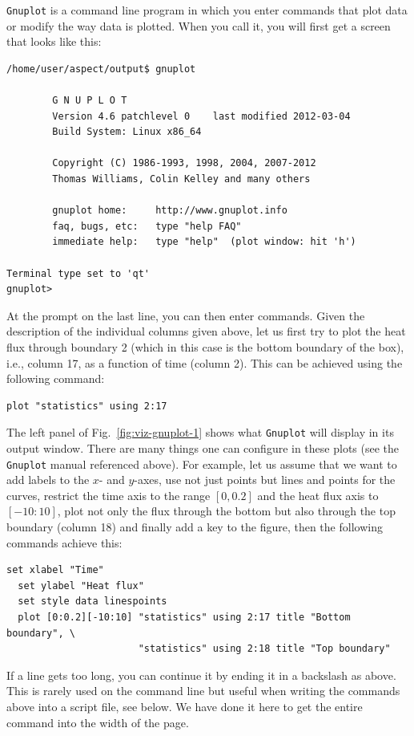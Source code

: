 \documentclass{article}
\begin{document}
\texttt{Gnuplot} is a command line program in which you enter commands that
plot data or modify the way data is plotted. When you call it, you will first
get a screen that looks like this:
\begin{lstlisting}[frame=single]
/home/user/aspect/output$ gnuplot

        G N U P L O T
        Version 4.6 patchlevel 0    last modified 2012-03-04 
        Build System: Linux x86_64

        Copyright (C) 1986-1993, 1998, 2004, 2007-2012
        Thomas Williams, Colin Kelley and many others

        gnuplot home:     http://www.gnuplot.info
        faq, bugs, etc:   type "help FAQ"
        immediate help:   type "help"  (plot window: hit 'h')

Terminal type set to 'qt'
gnuplot>
\end{lstlisting}
At the prompt on the last line, you can then enter commands. Given the
description of the individual columns given above, let us first try to 
plot the heat flux through boundary 2 (which in this case is the bottom
boundary of the box), i.e., column 17, as a function of time (column 2).
This can be achieved using the following command:
\begin{lstlisting}[frame=single,language=gnuplot]
  plot "statistics" using 2:17
\end{lstlisting}
The left panel of Fig.~\ref{fig:viz-gnuplot-1} shows what \texttt{Gnuplot}
will display in its output window. There are many things one can
configure in these plots (see the \texttt{Gnuplot} manual referenced above).
For example, let us assume that we want to add labels to the $x$- and $y$-axes,
use not just points but lines and points for the curves,
restrict the time axis to the range $[0,0.2]$ and the heat flux axis to
$[-10:10]$,
plot not only the flux through the bottom but also through the top boundary
(column 18) and finally add a key to the figure, then the following 
commands achieve this:
\begin{lstlisting}[frame=single,language=gnuplot]
  set xlabel "Time"
  set ylabel "Heat flux"
  set style data linespoints
  plot [0:0.2][-10:10] "statistics" using 2:17 title "Bottom boundary", \
                       "statistics" using 2:18 title "Top boundary"
\end{lstlisting}
If a line gets too long, you can continue it by ending it in a backslash as
above. This is rarely used on the command line but useful when writing the
commands above into a script file, see below. We have done it here to get
the entire command into the width of the page.
\end{document}
